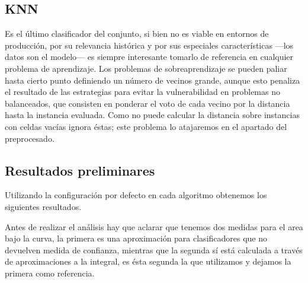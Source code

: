 \documentclass{article}
\newcommand{\img}[2]{
\noindent\makebox[\textwidth][c]{\texttt{[image: \#1]}}%
}
\begin{document}
\img{adaboost}{0.5}

\subsection{KNN}

Es el último clasificador del conjunto, si bien no es viable en entornos de producción, por su relevancia histórica y por sus especiales características ---los datos son el modelo--- es siempre interesante tomarlo de referencia en cualquier problema de aprendizaje. Los problemas de sobreaprendizaje se pueden paliar hasta cierto punto definiendo un número de vecinos grande, aunque esto penaliza el resultado de las estrategias para evitar la vulnerabilidad en problemas no balanceados, que consisten en ponderar el voto de cada vecino por la distancia hasta la instancia evaluada. Como no puede calcular la distancia sobre instancias con celdas vacías ignora éstas; este problema lo atajaremos en el apartado del preprocesado.

\subsection{Resultados preliminares}

Utilizando la configuración por defecto en cada algoritmo obtenemos los siguientes resultados.

\img{resultados1}{1.1}

Antes de realizar el análisis hay que aclarar que tenemos dos medidas para el area bajo la curva, la primera es una aproximación para clasificadores que no devuelven medida de confianza, mientras que la segunda sí está calculada a través de aproximaciones a la integral, es ésta segunda la que utilizamos y dejamos la primera como referencia.
\end{document}
